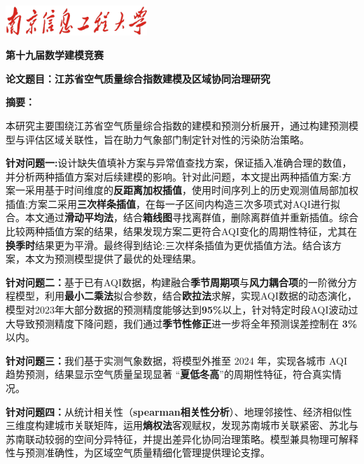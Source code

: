 \documentclass[a4paper,12pt]{article}
\begin{document}
	\newpage
	\setcounter{page}{1}
	
	\begin{center}
		\includegraphics[width=0.4\textwidth]{南京信息工程大学.png}
	\end{center}
	
	
	\begin{center}
		\textbf{ 第十九届数学建模竞赛}
	\end{center}
	
	\vspace{0.593cm}
	
	\begin{center}
		\heiti {}\textbf{论文题目：江苏省空气质量综合指数建模及区域协同治理研究\hspace{2cm}}
	\end{center}
	
	\begin{center}
		\lishu	{}\textbf{摘\quad 要：}\\
	\end{center}

	
	
	{
		
		本研究主要围绕江苏省空气质量综合指数的建模和预测分析展开，通过构建预测模型与评估区域关联性，旨在助力气象部门制定针对性的污染防治策略。
		
		\textbf{针对问题一:}设计缺失值填补方案与异常值查找方案，保证插入准确合理的数值，并分析两种插值方案对后续建模的影响。针对此问题，本文提出两种插值方案:方案一采用基于时间维度的\textbf{反距离加权插值}，使用时间序列上的历史观测值局部加权插值;方案二采用\textbf{三次样条插值}，在每一子区间内构造三次多项式对AQI进行拟合。本文通过\textbf{滑动平均法}，结合\textbf{箱线图}寻找离群值，删除离群值并重新插值。综合比较两种插值方案的结果，结果发现方案二更符合AQI变化的周期性特征，尤其在\textbf{换季时}结果更为平滑。最终得到结论:三次样条插值为更优插值方法。结合该方案，本文为预测模型提供了最优的处理结果。
		
		\textbf{针对问题二：}基于已有AQI数据，构建融合\textbf{季节周期项}与\textbf{风力耦合项}的一阶微分方程模型，利用\textbf{最小二乘法}拟合参数，结合\textbf{欧拉法}求解，实现AQI数据的动态演化，模型对2023年大部分数据的预测精度能够达到\textbf{95\%}以上，针对特定时段AQI波动过大导致预测精度下降问题，我们通过\textbf{季节性修正}进一步将全年预测误差控制在 \textbf{3\%} 以内。
		
		\textbf{针对问题三：}我们基于实测气象数据，将模型外推至 2024 年，实现各城市 AQI 趋势预测，结果显示空气质量呈现显著 “\textbf{夏低冬高}”的周期性特征，符合真实情况。
		
		\textbf{针对问题四：}从统计相关性（\textbf{spearman相关性分析}）、地理邻接性、经济相似性三维度构建城市关联矩阵，运用\textbf{熵权法}客观赋权，发现苏南城市关联紧密、苏北与苏南联动较弱的空间分异特征，并提出差异化协同治理策略。模型兼具物理可解释性与预测准确性，为区域空气质量精细化管理提供理论支撑。
	}
	
\end{document}
